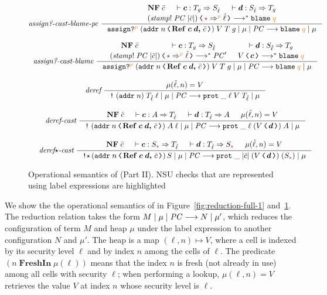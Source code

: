 \begin{figure}[tbp]
{\begin{gather*}
  \textit{assign?-cast-blame-pc}~
  \inference{\mathbf{NF}\;\bar{c} & \vdash \bm{c} : T_g \Rightarrow S_{\hat{\ell}} & \vdash \bm{d} : S_{\hat{\ell}} \Rightarrow T_g \\ \cccast{(\mathit{stamp!}\;\PC\;|\bar{c}|)}{\unk \Rightarrow^{\bl{p}} \hat{\ell}} \longrightarrow^{*} \blame{q}}
  {\reduce{\ccassignproj{\left(\cccast{\ccaddr{n}}{\coerc{\refco{\bm{c}}{\bm{d}}}{\bar{c}}}\right)}{V}{T}{g}{p}}{\mu}{\PC}{\blame{q}}{\mu}}
  \\[2ex]
  \textit{assign?-cast-blame}~
  \inference{\mathbf{NF}\;\bar{c} & \vdash \bm{c} : T_g \Rightarrow S_{\hat{\ell}} & \vdash \bm{d} : S_{\hat{\ell}} \Rightarrow T_g \\ \cccast{(\mathit{stamp!}\;\PC\;|\bar{c}|)}{\unk \Rightarrow^{\bl{p}} \hat{\ell}} \longrightarrow^{*} \PC' & \cccast{V}{\bm{c}} \longrightarrow^{*} \blame{q}}
  {\reduce{\ccassignproj{\left(\cccast{\ccaddr{n}}{\coerc{\refco{\bm{c}}{\bm{d}}}{\bar{c}}}\right)}{V}{T}{g}{p}}{\mu}{\PC}{\blame{q}}{\mu}}
  \\[2ex]
  \textit{deref}~
  \inference{\mu(\hat{\ell}, n) = V}
  {\reduce{\ccderef{(\ccaddr{n})}{T_{\hat{\ell}}}{\ell}}{\mu}{\PC}{\ccprot{\_}{\ell}{V}{T_{\hat{\ell}}}}{\mu}}
  \\[2ex]
  \textit{deref-cast}~
  \inference{\mathbf{NF}\;\bar{c} & \vdash \bm{c} : A \Rightarrow T_{\hat{\ell}} & \vdash \bm{d} : T_{\hat{\ell}} \Rightarrow A & \mu(\hat{\ell}, n) = V}
  {\reduce{\ccderef{\left(\cccast{\ccaddr{n}}{\coerc{\refco{\bm{c}}{\bm{d}}}{\bar{c}}}\right)}{A}{\ell}}{\mu}{\PC}{\ccprot{\_}{\ell}{(\cccast{V}{\bm{d}})}{A}}{\mu}}
  \\[2ex]
  \textit{deref}{\star}\textit{-cast}~
  \inference{\mathbf{NF}\;\bar{c} & \vdash \bm{c} : S_{\unk} \Rightarrow T_{\hat{\ell}} & \vdash \bm{d} : T_{\hat{\ell}} \Rightarrow S_{\unk} & \mu(\hat{\ell}, n) = V}
  {\reduce{\ccderefstar{\left(\cccast{\ccaddr{n}}{\coerc{\refco{\bm{c}}{\bm{d}}}{\bar{c}}}\right)}{S}}{\mu}{\PC}{\ccprot{\_}{|\bar{c}|}{(\cccast{V}{\bm{d}})}{(S_{\unk})}}{\mu}}
  \end{gather*}}
  \caption{Operational semantics of \CC (Part II). NSU checks that are
    represented using label expressions are highlighted}
  \label{fig:reduction-full-2}
\end{figure}

We show the the operational semantics of \CC in
Figure~\ref{fig:reduction-full-1} and~\ref{fig:reduction-full-2}. The reduction
relation takes the form ${M}\mid{\mu}\mid{\ensuremath{\mathit{PC}}}\longrightarrow{N}\mid{\mu'}$, which reduces the
configuration of term $M$ and heap $\mu$ under the label expression \PC to
another configuration $N$ and $\mu'$. The heap is a map $(\ell, n) \mapsto V$,
where a cell is indexed by its security level $\ell$ and by index $n$ among the
cells of $\ell$. The predicate $(n\;\mathbf{FreshIn}\;\mu(\ell))$ means that the
index $n$ is fresh (not already in use) among all cells with security $\ell$;
when performing a lookup, $\mu(\ell, n) = V$ retrieves the value $V$ at index
$n$ whose security level is $\ell$.

